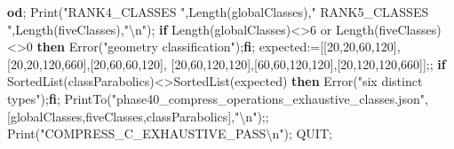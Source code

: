 \documentclass[
  10pt,
  letterpaper,
]{article}
\newenvironment{Shaded}{}{}
\newcommand{\BuiltInTok}[1]{\textcolor[rgb]{0.00,0.50,0.00}{#1}}
\newcommand{\ConstantTok}[1]{\textcolor[rgb]{0.53,0.00,0.00}{#1}}
\newcommand{\ControlFlowTok}[1]{\textcolor[rgb]{0.00,0.44,0.13}{\textbf{#1}}}
\newcommand{\FloatTok}[1]{\textcolor[rgb]{0.25,0.63,0.44}{#1}}
\newcommand{\NormalTok}[1]{#1}
\newcommand{\OperatorTok}[1]{\textcolor[rgb]{0.40,0.40,0.40}{#1}}
\newcommand{\StringTok}[1]{\textcolor[rgb]{0.25,0.44,0.63}{#1}}
\newcommand{\VariableTok}[1]{\textcolor[rgb]{0.10,0.09,0.49}{#1}}
\begin{document}
\begin{Shaded}
\begin{Highlighting}[]
\ControlFlowTok{od}\OperatorTok{;}
\BuiltInTok{Print}\NormalTok{(}\StringTok{"RANK4\_CLASSES "}\OperatorTok{,}\BuiltInTok{Length}\NormalTok{(}\VariableTok{globalClasses}\NormalTok{)}\OperatorTok{,}\StringTok{" RANK5\_CLASSES "}\OperatorTok{,}\BuiltInTok{Length}\NormalTok{(}\VariableTok{fiveClasses}\NormalTok{)}\OperatorTok{,}\StringTok{"\textbackslash{}n"}\NormalTok{)}\OperatorTok{;}
\ControlFlowTok{if} \BuiltInTok{Length}\NormalTok{(}\VariableTok{globalClasses}\NormalTok{)}\OperatorTok{\textless{}\textgreater{}}\FloatTok{6} \ConstantTok{or} \BuiltInTok{Length}\NormalTok{(}\VariableTok{fiveClasses}\NormalTok{)}\OperatorTok{\textless{}\textgreater{}}\FloatTok{0} \ControlFlowTok{then} \BuiltInTok{Error}\NormalTok{(}\StringTok{"geometry classification"}\NormalTok{)}\OperatorTok{;}\ControlFlowTok{fi}\OperatorTok{;}
\VariableTok{expected}\OperatorTok{:=}\NormalTok{[[}\FloatTok{20}\OperatorTok{,}\FloatTok{20}\OperatorTok{,}\FloatTok{60}\OperatorTok{,}\FloatTok{120}\NormalTok{]}\OperatorTok{,}\NormalTok{[}\FloatTok{20}\OperatorTok{,}\FloatTok{20}\OperatorTok{,}\FloatTok{120}\OperatorTok{,}\FloatTok{660}\NormalTok{]}\OperatorTok{,}\NormalTok{[}\FloatTok{20}\OperatorTok{,}\FloatTok{60}\OperatorTok{,}\FloatTok{60}\OperatorTok{,}\FloatTok{120}\NormalTok{]}\OperatorTok{,}
\NormalTok{ [}\FloatTok{20}\OperatorTok{,}\FloatTok{60}\OperatorTok{,}\FloatTok{120}\OperatorTok{,}\FloatTok{120}\NormalTok{]}\OperatorTok{,}\NormalTok{[}\FloatTok{60}\OperatorTok{,}\FloatTok{60}\OperatorTok{,}\FloatTok{120}\OperatorTok{,}\FloatTok{120}\NormalTok{]}\OperatorTok{,}\NormalTok{[}\FloatTok{20}\OperatorTok{,}\FloatTok{120}\OperatorTok{,}\FloatTok{120}\OperatorTok{,}\FloatTok{660}\NormalTok{]]}\OperatorTok{;;}
\ControlFlowTok{if} \BuiltInTok{SortedList}\NormalTok{(}\VariableTok{classParabolics}\NormalTok{)}\OperatorTok{\textless{}\textgreater{}}\BuiltInTok{SortedList}\NormalTok{(}\VariableTok{expected}\NormalTok{) }\ControlFlowTok{then} \BuiltInTok{Error}\NormalTok{(}\StringTok{"six distinct types"}\NormalTok{)}\OperatorTok{;}\ControlFlowTok{fi}\OperatorTok{;}
\BuiltInTok{PrintTo}\NormalTok{(}\StringTok{"phase40\_compress\_operations\_exhaustive\_classes.json"}\OperatorTok{,}
\NormalTok{ [}\VariableTok{globalClasses}\OperatorTok{,}\VariableTok{fiveClasses}\OperatorTok{,}\VariableTok{classParabolics}\NormalTok{]}\OperatorTok{,}\StringTok{"\textbackslash{}n"}\NormalTok{)}\OperatorTok{;;}
\BuiltInTok{Print}\NormalTok{(}\StringTok{"COMPRESS\_C\_EXHAUSTIVE\_PASS\textbackslash{}n"}\NormalTok{)}\OperatorTok{;}
\VariableTok{QUIT}\OperatorTok{;}
\end{Highlighting}
\end{Shaded}
\end{document}

